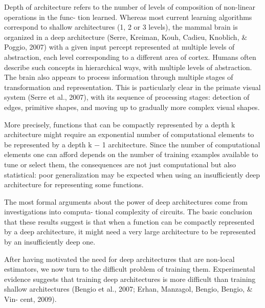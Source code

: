 \documentclass[cic,tc]{iiufrgs}
\begin{document}
  Depth of architecture refers to the number of levels of composition of
  non-linear operations in the func- tion learned. Whereas most current
  learning algorithms correspond to shallow architectures (1, 2 or 3 levels),
  the mammal brain is organized in a deep architecture (Serre, Kreiman, Kouh,
  Cadieu, Knoblich, & Poggio, 2007) with a given input percept represented at
  multiple levels of abstraction, each level corresponding to a different area
  of cortex.  Humans often describe such concepts in hierarchical ways, with
  multiple levels of abstraction. The brain also appears to process information
  through multiple stages of transformation and representation. This is
  particularly clear in the primate visual system (Serre et al., 2007), with
  its sequence of processing stages: detection of edges, primitive shapes, and
  moving up to gradually more complex visual shapes.\cite{bengio2009learning}

  More precisely, functions that can be compactly represented by a depth k
  architecture might require an exponential number of computational elements to
  be represented by a depth k − 1 architecture. Since the number of
  computational elements one can afford depends on the number of training
  examples available to tune or select them, the consequences are not just
  computational but also statistical: poor generalization may be expected when
  using an insufficiently deep architecture for representing some
  functions.\cite{bengio2009learning}

  The most formal arguments about the power of deep architectures come from
  investigations into computa- tional complexity of circuits. The basic
  conclusion that these results suggest is that when a function can be
  compactly represented by a deep architecture, it might need a very large
  architecture to be represented by an insufficiently deep
  one.\cite{bengio2009learning}

  After having motivated the need for deep architectures that are non-local
  estimators, we now turn to the difficult problem of training them.
  Experimental evidence suggests that training deep architectures is more
  difficult than training shallow architectures (Bengio et al., 2007; Erhan,
  Manzagol, Bengio, Bengio, & Vin- cent, 2009).\cite{bengio2009learning}
\end{document}
